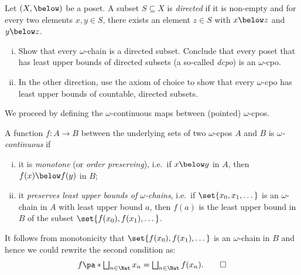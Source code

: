 \begin{exercise}\label{exer:directedness}
  Let \((X,{\below})\) be a poset. A subset \(S \subseteq X\) is \emph{directed}
  if it is non-empty and for every two elements \(x,y \in S\), there exists an
  element \(z \in S\) with \(x \below z\) and \(y \below z\).
  \begin{enumerate}[(i)]
  \item Show that every \(\omega\)-chain is a directed subset.
    Conclude that every poset that has least upper bounds of directed subsets (a
    so-called \emph{dcpo}) is an \(\omega\)-cpo.
  \item In the other direction, use the axiom of choice to show that every
    \(\omega\)-cpo has least upper bounds of countable, directed
    subsets.\qedhere
  \end{enumerate}
\end{exercise}

We proceed by defining the \(\omega\)-continuous maps between (pointed)
\(\omega\)-cpos.
\begin{definition}\label{def:continuity}
  A function \(f \colon A \to B\) between the underlying sets of two
  \(\omega\)-cpos \(A\) and \(B\) is \emph{\(\omega\)-continuous} if
  \begin{enumerate}[(i)]
  \item\label{monotone} it is \emph{monotone} (or \emph{order preserving}),
    i.e.\ if \(x \below y\) in \(A\), then \(f(x) \below f(y)\) in \(B\);
  \item\label{preserve-lub-of-omega-chains} it \emph{preserves least upper
      bounds of \(\omega\)-chains}, i.e.\ if \(\set{x_0,x_1,\dots}\) is an
    \(\omega\)-chain in \(A\) with least upper bound \(a\), then \(f(a)\) is the
    least upper bound in \(B\) of the subset \(\set{f(x_0),f(x_1),\dots}\). \qedhere
  \end{enumerate}
\end{definition}

\begin{remark}
  It follows from monotonicity that \(\set{f(x_0),f(x_1),\dots}\) is an
  \(\omega\)-chain in \(B\) and hence we could rewrite the second condition as:
  \[
    f\pa*{\textstyle\bigsqcup_{n \in \Nat}x_n} = \textstyle\bigsqcup_{n \in
      \Nat}f(x_n). \qedhere
  \]
\end{remark}

